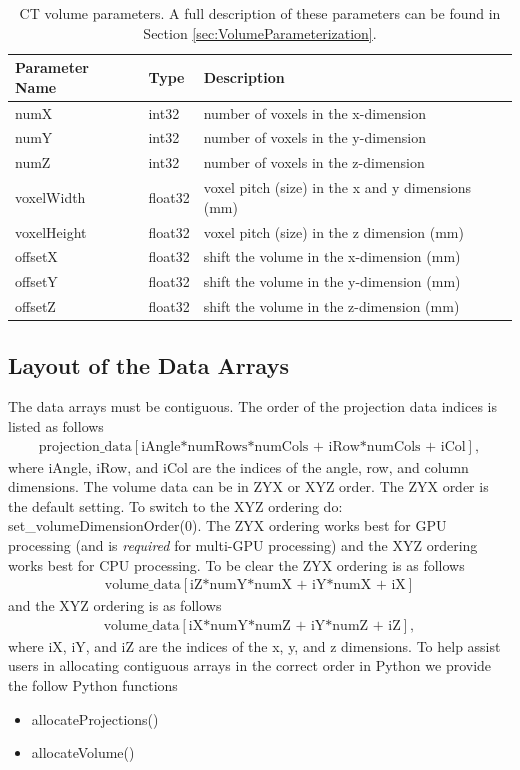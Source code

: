 \documentclass[11pt]{article}
\begin{document}
\begin{table}[h!]
\caption{CT volume parameters.  A full description of these parameters can be found in Section \ref{sec:VolumeParameterization}.} \label{tab:volumeParameters}
\begin{tabular}{l|l|p{9cm}}
Parameter Name & Type & Description \\
\hline
numX & int32 & number of voxels in the x-dimension \\
numY & int32 & number of voxels in the y-dimension \\
numZ & int32 & number of voxels in the z-dimension \\
voxelWidth & float32 & voxel pitch (size) in the x and y dimensions (mm) \\
voxelHeight & float32 & voxel pitch (size) in the z dimension (mm) \\
offsetX & float32 & shift the volume in the x-dimension (mm) \\
offsetY & float32 & shift the volume in the y-dimension (mm) \\
offsetZ & float32 & shift the volume in the z-dimension (mm)
\end{tabular}
\end{table}

\subsection{Layout of the Data Arrays} \label{sec:dataArrays}

The data arrays must be contiguous.  The order of the projection data indices is listed as follows
\begin{eqnarray*}
\text{projection\_data}[\text{iAngle*numRows*numCols + iRow*numCols + iCol}],
\end{eqnarray*}
where iAngle, iRow, and iCol are the indices of the angle, row, and column dimensions.  The volume data can be in ZYX or XYZ order.  The ZYX order is the default setting.  To switch to the XYZ ordering do: set\_volumeDimensionOrder(0).  The ZYX ordering works best for GPU processing (and is \textit{required} for multi-GPU processing) and the XYZ ordering works best for CPU processing.  To be clear the ZYX ordering is as follows
\begin{eqnarray*}
\text{volume\_data}[\text{iZ*numY*numX + iY*numX + iX}]
\end{eqnarray*}
and the XYZ ordering is as follows
\begin{eqnarray*}
\text{volume\_data}[\text{iX*numY*numZ + iY*numZ + iZ}],
\end{eqnarray*}
where iX, iY, and iZ are the indices of the x, y, and z dimensions.  To help assist users in allocating contiguous arrays in the correct order in Python we provide the follow Python functions
\begin{itemize}
    \item[] allocateProjections()
    \item[] allocateVolume()
\end{itemize}
\end{document}
